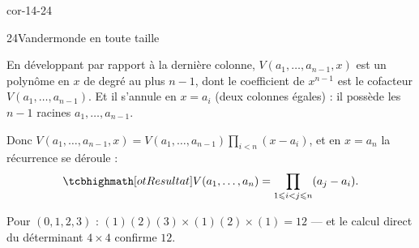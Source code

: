\begin{blocLivre}{cor-14-24}
\begin{corrige}{24}{Vandermonde en toute taille}
\begin{questions}
  \item En développant par rapport à la dernière colonne,
    $V(a_1,\dots,a_{n-1},x)$ est un polynôme en $x$ de degré au plus
    $n-1$, dont le coefficient de $x^{n-1}$ est le cofacteur
    $V(a_1,\dots,a_{n-1})$. Et il s'annule en $x=a_i$ (deux colonnes
    égales) : il possède les $n-1$ racines $a_1,\dots,a_{n-1}$.
  \item Donc
    $V(a_1,\dots,a_{n-1},x)=V(a_1,\dots,a_{n-1})\prod_{i<n}(x-a_i)$, et
    en $x=a_n$ la récurrence se déroule :
    \[
    \res{V(a_1,\dots,a_n)=\prod_{1\leqslant i<j\leqslant n}(a_j-a_i)}.
    \]
  \item Pour $(0,1,2,3)$ :
    $(1)(2)(3)\times(1)(2)\times(1)=12$ — et le calcul direct du
    déterminant $4\times4$ confirme $12$.
\end{questions}
\end{corrige}
\end{blocLivre}


